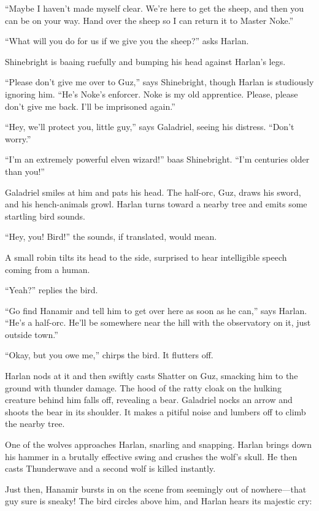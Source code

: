 \documentclass[smalldemyvopaper,11pt,twoside,onecolumn,openright,extrafontsizes]{memoir}
\begin{document}
``Maybe I haven't made myself clear. We're here to get the sheep, and
then you can be on your way. Hand over the sheep so I can return it to
Master Noke.''

``What will you do for us if we give you the sheep?'' asks Harlan.

Shinebright is baaing ruefully and bumping his head against Harlan's
legs.

``Please don't give me over to Guz,'' says Shinebright, though Harlan is
studiously ignoring him. ``He's Noke's enforcer. Noke is my old
apprentice. Please, please don't give me back. I'll be imprisoned
again.''

``Hey, we'll protect you, little guy,'' says Galadriel, seeing his
distress. ``Don't worry.''

``I'm an extremely powerful elven wizard!'' baas Shinebright. ``I'm
centuries older than you!''

Galadriel smiles at him and pats his head. The half-orc, Guz, draws his
sword, and his hench-animals growl. Harlan turns toward a nearby tree
and emits some startling bird sounds.

``Hey, you! Bird!'' the sounds, if translated, would mean.

A small robin tilts its head to the side, surprised to hear intelligible
speech coming from a human.

``Yeah?'' replies the bird.

``Go find Hanamir and tell him to get over here as soon as he can,''
says Harlan. ``He's a half-orc. He'll be somewhere near the hill with
the observatory on it, just outside town.''

``Okay, but you owe me,'' chirps the bird. It flutters off.

Harlan nods at it and then swiftly casts Shatter on Guz, smacking him to
the ground with thunder damage. The hood of the ratty cloak on the
hulking creature behind him falls off, revealing a bear. Galadriel nocks
an arrow and shoots the bear in its shoulder. It makes a pitiful noise
and lumbers off to climb the nearby tree.

One of the wolves approaches Harlan, snarling and snapping. Harlan
brings down his hammer in a brutally effective swing and crushes the
wolf's skull. He then casts Thunderwave and a second wolf is killed
instantly.

Just then, Hanamir bursts in on the scene from seemingly out of
nowhere---that guy sure is sneaky! The bird circles above him, and
Harlan hears its majestic cry:
\end{document}
